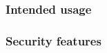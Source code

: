 \documentclass[10pt]{article}
\newenvironment{checklist}{%
  \begin{list}{}{}%
  \let\olditem\item
  \renewcommand\item{\olditem -- \marginpar{$\Box$} }
  \newcommand\checkeditem{\olditem -- \marginpar{$\CheckedBox$} }
}{%
  \end{list}
}
\begin{document}
      \subsubsection{Intended usage}
      \subsubsection{Security features}

%
%
%
%
%
%
\end{document}
